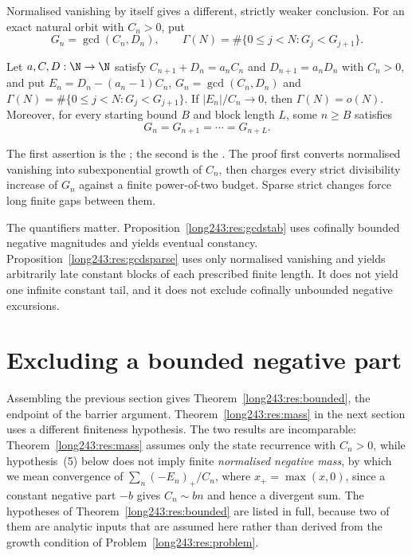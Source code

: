 \documentclass[11pt]{article}
\begin{document}
Normalised vanishing by itself gives a different, strictly weaker conclusion.
For an exact natural orbit with $C_n>0$, put
\[
 G_n=\gcd(C_n,D_n),\qquad
 \Gamma(N)=\#\{0\le j<N:G_j<G_{j+1}\}.
\]

\begin{proposition}
\label{long243:res:gcdsparse}
Let $a,C,D:\N\to\N$ satisfy $C_{n+1}+D_n=a_nC_n$ and $D_{n+1}=a_nD_n$ with
$C_n>0$, and put $E_n=D_n-(a_n-1)C_n$, $G_n=\gcd(C_n,D_n)$ and
$\Gamma(N)=\#\{0\le j<N:G_j<G_{j+1}\}$.  If $|E_n|/C_n\to0$, then
$\Gamma(N)=o(N)$.  Moreover, for every starting bound $B$ and block length
$L$, some $n\ge B$ satisfies
\[
  G_n=G_{n+1}=\cdots=G_{n+L}.
\]
\end{proposition}

\noindent The first assertion is the
; the second is the
.  The proof first converts normalised vanishing
into subexponential growth of $C_n$, then charges every strict divisibility
increase of $G_n$ against a finite power-of-two budget.  Sparse strict changes
force long finite gaps between them.

The quantifiers matter.  Proposition~\ref{long243:res:gcdstab} uses cofinally bounded
negative magnitudes and yields eventual constancy.  Proposition~\ref{long243:res:gcdsparse}
uses only normalised vanishing and yields arbitrarily late constant blocks of
each prescribed finite length.  It does not yield one infinite constant tail,
and it does not exclude cofinally unbounded negative excursions.

\section{Excluding a bounded negative part}\label{long243:sec:bounded}

Assembling the previous section gives Theorem~\ref{long243:res:bounded}, the endpoint
of the barrier argument.  Theorem~\ref{long243:res:mass} in the next section uses a
different finiteness hypothesis.  The two results are incomparable:
Theorem~\ref{long243:res:mass} assumes only the state recurrence with $C_n>0$, while
hypothesis~(5) below does not imply
finite \emph{normalised negative mass}, by which we mean convergence of
$\sum_n(-E_n)_+/C_n$, where $x_+=\max(x,0)$, since a constant negative part
$-b$ gives $C_n\sim bn$ and hence a divergent sum.  The hypotheses of
Theorem~\ref{long243:res:bounded} are listed
in full, because two of them are analytic inputs
that are assumed here rather than derived from the growth condition of
Problem~\ref{long243:res:problem}.
\end{document}
